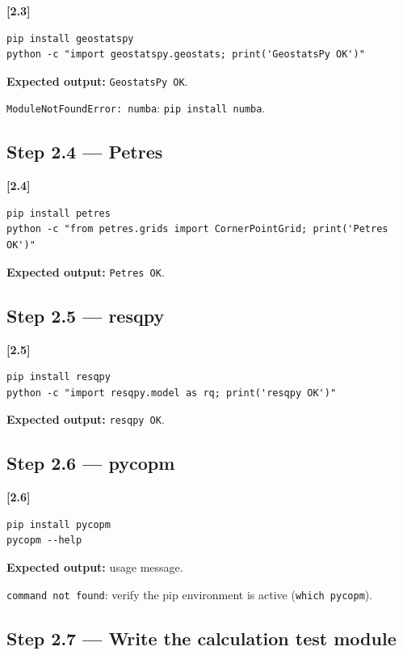 \documentclass[10pt,a4paper]{article}
\newcommand{\stepID}[1]{\textsf{\textbf{[#1]}}}
\newcommand{\cmd}[1]{\texttt{#1}}
\begin{document}
\stepID{2.3}
\begin{lstlisting}[style=sh]
pip install geostatspy
python -c "import geostatspy.geostats; print('GeostatsPy OK')"
\end{lstlisting}

\textbf{Expected output:} \cmd{GeostatsPy OK}.

\begin{failure}
\texttt{ModuleNotFoundError: numba}: \cmd{pip install numba}.
\end{failure}

\subsection{Step 2.4 --- Petres}

\stepID{2.4}
\begin{lstlisting}[style=sh]
pip install petres
python -c "from petres.grids import CornerPointGrid; print('Petres OK')"
\end{lstlisting}

\textbf{Expected output:} \cmd{Petres OK}.

\subsection{Step 2.5 --- resqpy}

\stepID{2.5}
\begin{lstlisting}[style=sh]
pip install resqpy
python -c "import resqpy.model as rq; print('resqpy OK')"
\end{lstlisting}

\textbf{Expected output:} \cmd{resqpy OK}.

\subsection{Step 2.6 --- pycopm}

\stepID{2.6}
\begin{lstlisting}[style=sh]
pip install pycopm
pycopm --help
\end{lstlisting}

\textbf{Expected output:} usage message.

\begin{failure}
\texttt{command not found}: verify the pip environment is active (\cmd{which pycopm}).
\end{failure}

\subsection{Step 2.7 --- Write the calculation test module}
\end{document}
